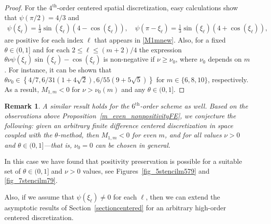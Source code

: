 \documentclass[a4paper]{article}
\newtheorem{remark}{Remark}
\begin{document}
\begin{description}[style=unboxed,leftmargin=0cm]
\begin{proof}
	For the $4^\text{th}$-order centered spatial discretization, easy calculations show that $\psi(\pi/2) = 4/3$
	and
	\begin{align*}
		\psi(\xi_\ell) = \frac{1}{3}\sin(\xi_\ell)(4 - \cos(\xi_\ell)), \quad
		\psi(\pi - \xi_\ell) = \frac{1}{3}\sin(\xi_\ell)(4 + \cos(\xi_\ell)),
	\end{align*}
	are positive for each index $\ell$ that appears in \eqref{M1mnew}.
	Also, for a fixed $\theta \in (0,1]$ and for each $2 \le \ell \le (m+2)/4$ the expression
	$\theta\nu\psi(\xi_\ell)\sin(\xi_\ell)-\cos(\xi_\ell)$ is non-negative if $\nu \ge \nu_0$, where $\nu_0$
	depends on $m$.
	For instance, it can be shown that
	$\theta\nu_0 \in \left\{4/7, 6/31(1 + 4 \sqrt{2}), 6/55(9 + 5 \sqrt{5})\right\}$ for $m \in \{6,8,10\}$,
	respectively.
	As a result, $M_{1,m} < 0$ for $\nu > \nu_0(m)$ and any $\theta \in (0,1]$.
\end{proof}
\begin{remark}
	A similar result holds for the $6^\text{th}$-order scheme as well.
	Based on the observations above Proposition~\ref{m_even_nonpositivityFE}, we conjecture the following:
	given an arbitrary finite difference centered discretization in space coupled with the $\theta$-method, then
	$M_{1,m} < 0$ for even $m$, and for all values $\nu > 0$ and $\theta \in (0,1]$---that is, $\nu_0=0$ can be chosen in general.
\end{remark}
\item [{Case 2:} $m$ is {odd}.] In this case we have found that positivity preservation is possible for a suitable
set of $\theta\in(0,1]$ and $\nu>0$ values, see  Figures~\ref{fig_5stencilm579} and \ref{fig_7stencilm79}.

Also, if we assume that $\psi(\xi_\ell) \ne 0$ for each $\ell$, then we can extend the asymptotic results of
Section~\ref{sectioncentered} for an arbitrary high-order centered discretization.
\end{description}
\end{document}
